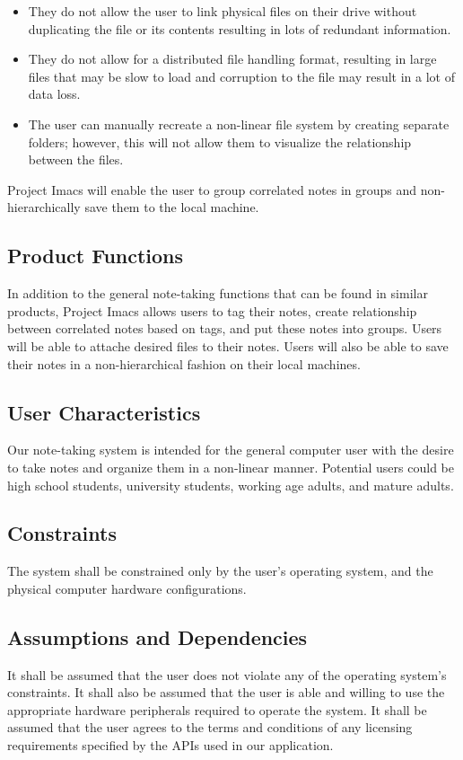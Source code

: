 \documentclass{article}
\begin{document}
\begin{itemize}
    \item They do not allow the user to link physical files on their drive without duplicating the file or its contents resulting in lots of redundant information.
    \item They do not allow for a distributed file handling format, resulting in large files that may be slow to load and corruption to the file may result in a lot of data loss.
    \item The user can manually recreate a non-linear file system by creating separate folders; however, this will not allow them to visualize the relationship between the files.
\end{itemize}

Project Imacs will enable the user to group correlated notes in groups and non-hierarchically save them to the local machine.

\subsection{Product Functions}
In addition to the general note-taking functions that can be found in similar products, Project Imacs allows users to tag their notes, create relationship between correlated notes based on tags, and put these notes into groups. Users will be able to attache desired files to their notes. Users will also be able to save their notes in a non-hierarchical fashion on their local machines.

\subsection{User Characteristics}
Our note-taking system is intended for the general computer user with the desire to take notes and organize them in a non-linear manner. Potential users could be high school students, university students, working age adults, and mature adults.

\subsection{Constraints}
The system shall be constrained only by the user's operating system, and the physical computer hardware configurations.

\subsection{Assumptions and Dependencies}
It shall be assumed that the user does not violate any of the operating system's constraints. It shall also be assumed that the user is able and willing to use the appropriate hardware peripherals required to operate the system.
It shall be assumed that the user agrees to the terms and conditions of any licensing requirements specified by the APIs used in our application.
\end{document}
